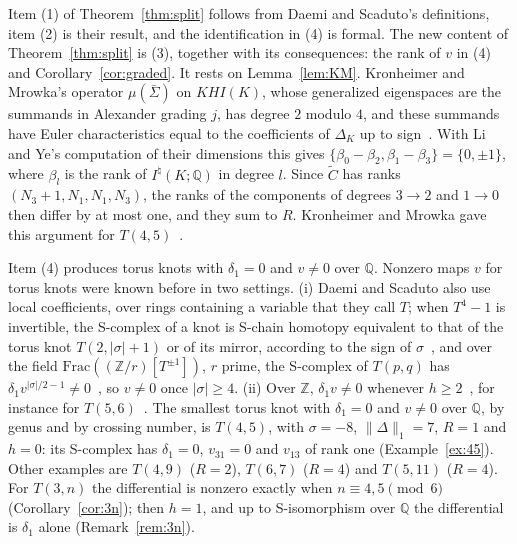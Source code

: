 \documentclass[11pt,reqno]{amsart}
\theoremstyle{plain}
\theoremstyle{definition}
\newcommand{\Z}{\mathbb{Z}}
\newcommand{\Q}{\mathbb{Q}}
\newcommand{\Inat}{I^{\natural}}
\newcommand{\tC}{\widetilde C}
\begin{document}
Item (1) of Theorem~\ref{thm:split} follows from Daemi and Scaduto's definitions, item (2) is their
result, and the identification in (4) is formal. The new content of Theorem~\ref{thm:split} is (3),
together with its consequences: the rank of $v$ in (4) and Corollary~\ref{cor:graded}. It rests on
Lemma~\ref{lem:KM}. Kronheimer and Mrowka's operator $\mu(\bar\Sigma)$ on $KHI(K)$, whose generalized
eigenspaces are the summands in Alexander grading $j$, has degree $2$ modulo $4$, and these summands have
Euler characteristics equal to the coefficients of $\Delta_K$ up to sign~\cite{KMAlex,Lim}. With Li and Ye's
computation of their dimensions this gives $\{\beta_0-\beta_2,\beta_1-\beta_3\}=\{0,\pm1\}$, where $\beta_l$ is
the rank of $\Inat(K;\Q)$ in degree $l$. Since $\tC$ has ranks $(N_3+1,N_1,N_1,N_3)$, the ranks of the
components of degrees $3\to2$ and $1\to0$ then differ by at most one, and they sum to $R$. Kronheimer and
Mrowka gave this argument for $T(4,5)$~\cite[\S11]{KMfilt}.

Item (4) produces torus knots with $\delta_1=0$ and $v\neq0$ over $\Q$. Nonzero maps $v$ for torus knots
were known before in two settings. (i) Daemi and Scaduto also use local coefficients, over rings
containing a variable that they call $T$; when $T^4-1$ is invertible, the S-complex of a knot is S-chain
homotopy equivalent to that of the torus knot $T(2,|\sigma|+1)$ or of its mirror, according to the sign
of $\sigma$~\cite[\S1, Thm.~10]{DScaduto}, and over the field $\mathrm{Frac}((\Z/r)[T^{\pm1}])$, $r$ prime,
the S-complex of $T(p,q)$ has $\delta_1v^{|\sigma|/2-1}\neq0$~\cite[\S4.5, proof of Thm.~4]{DScaduto}, so
$v\neq0$ once $|\sigma|\ge4$. (ii) Over $\Z$, $\delta_1v\neq0$ whenever $h\ge2$~\cite[Prop.~4.15]{DSEquiv},
for instance for $T(5,6)$~\cite[\S4.1, Cor.~4]{DScaduto}. The smallest torus knot with $\delta_1=0$ and
$v\neq0$ over $\Q$, by genus and by crossing number, is $T(4,5)$, with $\sigma=-8$, $\|\Delta\|_1=7$, $R=1$
and $h=0$: its S-complex has $\delta_1=0$, $v_{31}=0$ and $v_{13}$ of rank one (Example~\ref{ex:45}). Other
examples are $T(4,9)$ ($R=2$), $T(6,7)$ ($R=4$) and $T(5,11)$ ($R=4$). For $T(3,n)$ the differential is
nonzero exactly when $n\equiv4,5\pmod6$ (Corollary~\ref{cor:3n}); then $h=1$, and up to S-isomorphism over $\Q$ the
differential is $\delta_1$ alone (Remark~\ref{rem:3n}).
\end{document}

